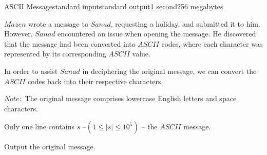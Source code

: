 \begin{problem}{ASCII Message}{standard input}{standard output}{1 second}{256 megabytes}

$Mazen$ wrote a message to $Sanad$, requesting a holiday, and submitted it to him. However, $Sanad$ encountered an issue when opening the message. He discovered that the message had been converted into $ASCII$ codes, where each character was represented by its corresponding $ASCII$ value.

In order to assist $Sanad$ in deciphering the original message, we can convert the $ASCII$ codes back into their respective characters. 

$Note:$ The original message comprises lowercase English letters and space characters.

\InputFile
Only one line contains $s$ --$(1 \le |s| \le 10^5)$ -- the $ASCII$ message.

\OutputFile
Output the original message.

\Example

\begin{example}
%
\end{example}

\end{problem}

